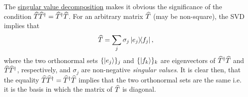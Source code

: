 The \href{https://en.wikipedia.org/wiki/Singular_value_decomposition (SVD)}{singular value decomposition} makes it obvious the significance of the condition $\widehat{T}\widehat{T}^{\dagger} = \widehat{T}^{\dagger} \widehat{T}$. For an arbitrary matrix $\widehat{T}$ (may be non-square), the SVD implies that
\begin{align}
	\op T = \sum_{j} \sigma_j \dyad{e_j}{f_j},
\end{align}
where the two orthonormal sets $\{\ket{e_j}\}_j$ and $\{\ket{f_k}\}_k$ are eigenvectors of $\widehat{T}^{\dagger} \widehat{T}$ and $\widehat{T} \widehat{T}^{\dagger}$, respectively, and $\sigma_j$ are non-negative \emph{singular values}. It is clear then, that the equality $\widehat{T}\widehat{T}^{\dagger} = \widehat{T}^{\dagger}\widehat{T}$ implies that the two orthonormal sets are the same i.e. it is the basis in which the matrix of $\widehat{T}$ is diagonal.